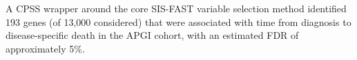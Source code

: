 \documentclass[dissertation.tex]{subfiles}
\begin{document}


A \gls{CPSS} wrapper around the core \gls{SIS}-\gls{FAST} variable selection method \cite{Gorst-Rasmussen2013} identified 193 genes (of 13,000 considered) that were associated with time from diagnosis to disease-specific death in the \gls{APGI} cohort, with an estimated \gls{FDR} of approximately 5\%.
\end{document}
